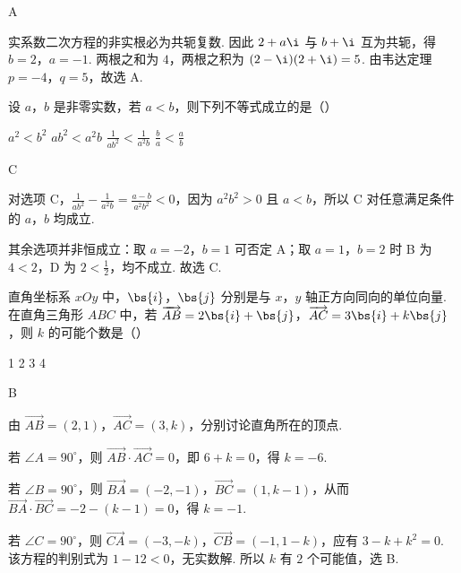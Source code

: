 \begin{answer}
A
\end{answer}

\begin{solution}
实系数二次方程的非实根必为共轭复数. 因此 \(2+a\i\) 与 \(b+\i\) 互为共轭，得 \(b=2\)，\(a=-1\). 两根之和为 \(4\)，两根之积为 \((2-\i)(2+\i)=5\). 由韦达定理 \(p=-4\)，\(q=5\)，故选 A.
\end{solution}

\begin{problem}
设 \(a\)，\(b\) 是非零实数，若 \(a < b\)，则下列不等式成立的是（\quad）

\choices
    {\(a^2 < b^2\)}
    {\(ab^{2} < a^{2}b\)}
    {\(\frac{1}{ab^2} < \frac{1}{a^2b}\)}
    {\(\frac{b}{a} < \frac{a}{b}\)}
\end{problem}

\begin{answer}
C
\end{answer}

\begin{solution}
对选项 C，\(\frac{1}{ab^2}-\frac{1}{a^2b}=\frac{a-b}{a^2b^2}<0\)，因为 \(a^2b^2>0\) 且 \(a<b\)，所以 C 对任意满足条件的 \(a\)，\(b\) 均成立.

其余选项并非恒成立：取 \(a=-2\)，\(b=1\) 可否定 A；取 \(a=1\)，\(b=2\) 时 B 为 \(4<2\)，D 为 \(2<\frac12\)，均不成立. 故选 C.
\end{solution}

\begin{problem}
直角坐标系 \(xOy\) 中，\(\bs{i}\)，\(\bs{j}\) 分别是与 \(x\)，\(y\) 轴正方向同向的单位向量. 在直角三角形 \(ABC\) 中，若 \(\overrightarrow{AB} = 2\bs{i} + \bs{j}\)，\(\overrightarrow{AC} = 3\bs{i} + k\bs{j}\)，则 \(k\) 的可能个数是（\quad）

\choices
    {1}
    {2}
    {3}
    {4}
\end{problem}

\begin{answer}
B
\end{answer}

\begin{solution}
由 \(\overrightarrow{AB}=(2,1)\)，\(\overrightarrow{AC}=(3,k)\)，分别讨论直角所在的顶点.

若 \(\angle A=90^\circ\)，则 \(\overrightarrow{AB}\cdot\overrightarrow{AC}=0\)，即 \(6+k=0\)，得 \(k=-6\).

若 \(\angle B=90^\circ\)，则 \(\overrightarrow{BA}=(-2,-1)\)，\(\overrightarrow{BC}=(1,k-1)\)，从而 \(\overrightarrow{BA}\cdot\overrightarrow{BC}=-2-(k-1)=0\)，得 \(k=-1\).

若 \(\angle C=90^\circ\)，则 \(\overrightarrow{CA}=(-3,-k)\)，\(\overrightarrow{CB}=(-1,1-k)\)，应有 \(3-k+k^2=0\). 该方程的判别式为 \(1-12<0\)，无实数解. 所以 \(k\) 有 \(2\) 个可能值，选 B.
\end{solution}

